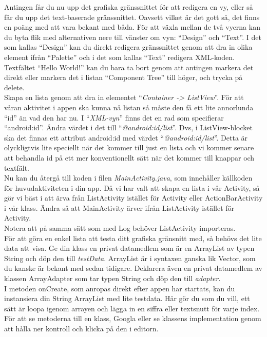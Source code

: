 \documentclass[11 pt, titlepage]{article} %
\begin{document}
Antingen får du nu upp det grafiska gränssnittet för att redigera en vy, eller så får du upp det text-baserade gränssnittet.
Oavsett vilket är det gott så, det finns en poäng med att vara bekant med båda.
För att växla mellan de två vyerna kan du byta flik med alternativen nere till vänster om vyn: ``Design'' och ``Text''.
I det som kallas ``Design'' kan du direkt redigera gränssnittet genom att dra in olika element ifrån “Palette” och i det som kallas ``Text'' redigera XML-koden.\\

Textfältet “Hello World!” kan du bara ta bort genom att antingen markera det direkt eller markera det i listan “Component Tree” till höger, och trycka på delete.\\

Skapa en lista genom att dra in elementet “\textit{Container -> ListView}”.
För att våran aktivitet i appen ska kunna nå listan så måste den få ett lite annorlunda “id” än vad den har nu.
I “\textit{XML-vyn}” finns det en rad som specifierar “android:id”.
Ändra värdet i det till “\textit{@android:id/list}”. Dvs, i ListView-blocket ska det finnas ett attribut android:id med värdet “\textit{@android:id/list}”. 
Detta är olyckligtvis lite speciellt när det kommer till just en lista och vi kommer senare att behandla id på ett mer konventionellt sätt när det kommer till knappar och textfält.\\

Nu kan du återgå till koden i filen \textit{MainActivity.java}, som innehåller källkoden för huvudaktiviteten i din app.
Då vi har valt att skapa en lista i vår Activity, så gör vi bäst i att ärva från ListActivity istället för Activity eller ActionBarActivity i vår klass.
Ändra så att MainActivity ärver ifrån ListActivity istället för Activity. \\

Notera att på samma sätt som med Log behöver ListActivity importeras. \\

För att göra en enkel lista att testa ditt grafiska gränsnitt med, så behövs det lite data att visa.
Ge din klass en privat datamedlem som är en ArrayList av typen String och döp den till \textit{testData}.
ArrayList är i syntaxen ganska lik Vector, som du kanske är bekant med sedan tidigare.
Deklarera även en privat datamedlem av klassen ArrayAdapter som tar typen String och döp den till \textit{adapter}.\\

I metoden onCreate, som anropas direkt efter appen har startats, kan du instansiera din String ArrayList med lite testdata.
Här gör du som du vill, ett sätt är loopa igenom arrayen och lägga in en siffra eller textsnutt för varje index. För att se metoderna till en klass, Googla eller se klassens implementation genom att hålla ner kontroll och klicka på den i editorn. \\
\end{document}
